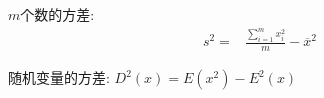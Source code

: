 $m$个数的方差: 
$$\begin{aligned}s^2=&\frac{\sum_{i=1}^m x_i^2}m-\overline x^2\end{aligned}$$

随机变量的方差: $D^2(x)=E(x^2)-E^2(x)$